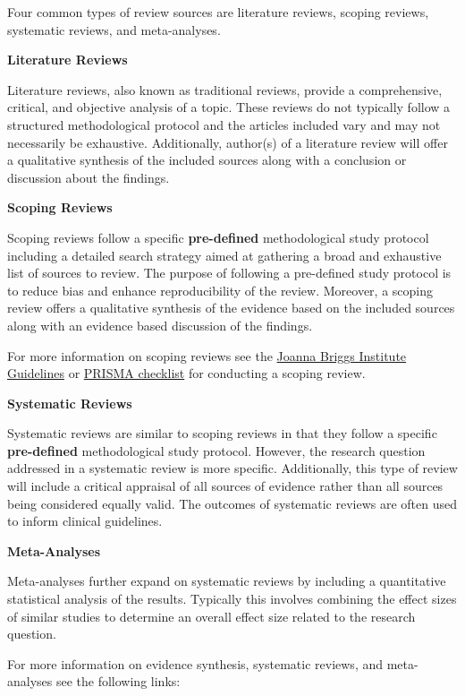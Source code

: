 \documentclass[
]{book}
\begin{document}
Four common types of review sources are literature reviews, scoping reviews, systematic reviews, and meta-analyses.

\textbf{Literature Reviews}

Literature reviews, also known as traditional reviews, provide a comprehensive, critical, and objective analysis of a topic. These reviews do not typically follow a structured methodological protocol and the articles included vary and may not necessarily be exhaustive. Additionally, author(s) of a literature review will offer a qualitative synthesis of the included sources along with a conclusion or discussion about the findings.

\textbf{Scoping Reviews}

Scoping reviews follow a specific \textbf{pre-defined} methodological study protocol including a detailed search strategy aimed at gathering a broad and exhaustive list of sources to review. The purpose of following a pre-defined study protocol is to reduce bias and enhance reproducibility of the review. Moreover, a scoping review offers a qualitative synthesis of the evidence based on the included sources along with an evidence based discussion of the findings.

For more information on scoping reviews see the \href{https://jbi-global-wiki.refined.site/space/MANUAL/4687342/Chapter+11\%3A+Scoping+reviews}{Joanna Briggs Institute Guidelines} or \href{https://prisma-statement.org/Extensions/ScopingReviews}{PRISMA checklist} for conducting a scoping review.

\textbf{Systematic Reviews}

Systematic reviews are similar to scoping reviews in that they follow a specific \textbf{pre-defined} methodological study protocol. However, the research question addressed in a systematic review is more specific. Additionally, this type of review will include a critical appraisal of all sources of evidence rather than all sources being considered equally valid. The outcomes of systematic reviews are often used to inform clinical guidelines.

\textbf{Meta-Analyses}

Meta-analyses further expand on systematic reviews by including a quantitative statistical analysis of the results. Typically this involves combining the effect sizes of similar studies to determine an overall effect size related to the research question.

For more information on evidence synthesis, systematic reviews, and meta-analyses see the following links:
\end{document}
